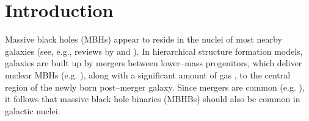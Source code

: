 




\section{Introduction}

Massive black holes (MBHs) appear to reside in the nuclei of most
nearby galaxies (see, e.g., reviews by \citealt{kr95} and
\citealt{ff05}).  In hierarchical structure formation models, galaxies
are built up by mergers between lower--mass progenitors, which deliver
nuclear MBHs (e.g. \citealt{Springel+2005,Robertson+2006}), along with
a significant amount of gas \citep{BH1992}, to the central region of
the newly born post--merger galaxy.  Since mergers are common
(e.g. \citealt{HK2002}), it follows that massive black hole binaries
(MBHBs) should also be common in galactic nuclei.

